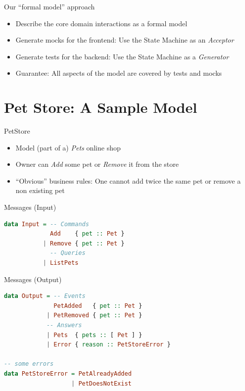 \begin{frame}[fragile]{Our ``formal model'' approach}

  \begin{itemize}[<+->]
  \item Describe the core domain interactions as a formal model
  \item Generate mocks for the frontend: Use the State Machine as an \emph{Acceptor}
  \item Generate tests for the backend: Use the State Machine as a \emph{Generator}
  \item Guarantee: All aspects of  the model are covered by tests and mocks
  \end{itemize}

\end{frame}


\part{Pet Store: A Sample Model}

\begin{frame}[fragile]{PetStore}
  \begin{itemize}[<+->]
  \item Model (part of a) \emph{Pets} online shop
  \item Owner can \emph{Add} some pet or \emph{Remove} it from the store
  \item ``Obvious'' business rules: One cannot add twice the same pet or remove a non existing pet
  \end{itemize}
\end{frame}

\begin{frame}[fragile]{Messages (Input)}
\begin{lstlisting}[language=Haskell,basicstyle=\ttfamily,keywordstyle=\color{red}]
data Input = -- Commands
             Add    { pet :: Pet }
           | Remove { pet :: Pet }
             -- Queries
           | ListPets
\end{lstlisting}
\end{frame}

\begin{frame}[fragile]{Messages (Output)}
\begin{lstlisting}[language=Haskell,basicstyle=\ttfamily,keywordstyle=\color{red}]
data Output = -- Events
              PetAdded   { pet :: Pet }
            | PetRemoved { pet :: Pet }
            -- Answers
            | Pets  { pets :: [ Pet ] }
            | Error { reason :: PetStoreError }

-- some errors
data PetStoreError = PetAlreadyAdded
                   | PetDoesNotExist
\end{lstlisting}
\end{frame}


